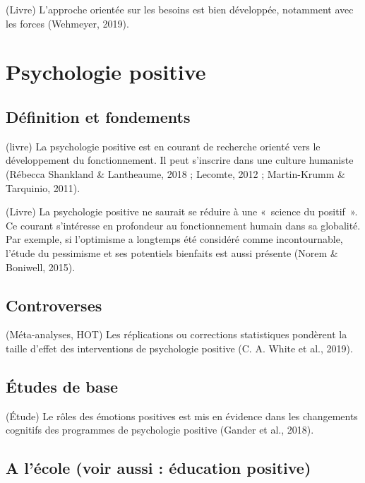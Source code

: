 \documentclass[
  french,
]{article}
\begin{document}
(Livre) L'approche orientée sur les besoins est bien développée, notamment avec les forces (Wehmeyer, 2019).

\hypertarget{psychologie-positive}{%
\section{Psychologie positive}\label{psychologie-positive}}

\hypertarget{duxe9finition-et-fondements}{%
\subsection{Définition et fondements}\label{duxe9finition-et-fondements}}

(livre) La psychologie positive est en courant de recherche orienté vers le développement du fonctionnement. Il peut s'inscrire dans une culture humaniste (Rébecca Shankland \& Lantheaume, 2018 ; Lecomte, 2012 ; Martin-Krumm \& Tarquinio, 2011).

(Livre) La psychologie positive ne saurait se réduire à une «~science du positif~». Ce courant s'intéresse en profondeur au fonctionnement humain dans sa globalité. Par exemple, si l'optimisme a longtemps été considéré comme incontournable, l'étude du pessimisme et ses potentiels bienfaits est aussi présente (Norem \& Boniwell, 2015).

\hypertarget{controverses}{%
\subsection{Controverses}\label{controverses}}

(Méta-analyses, HOT) Les réplications ou corrections statistiques pondèrent la taille d'effet des interventions de psychologie positive (C. A. White et al., 2019).

\hypertarget{uxe9tudes-de-base}{%
\subsection{Études de base}\label{uxe9tudes-de-base}}

(Étude) Le rôles des émotions positives est mis en évidence dans les changements cognitifs des programmes de psychologie positive (Gander et al., 2018).

\hypertarget{a-luxe9cole-voir-aussi-uxe9ducation-positive}{%
\subsection{A l'école (voir aussi : éducation positive)}\label{a-luxe9cole-voir-aussi-uxe9ducation-positive}}
\end{document}
